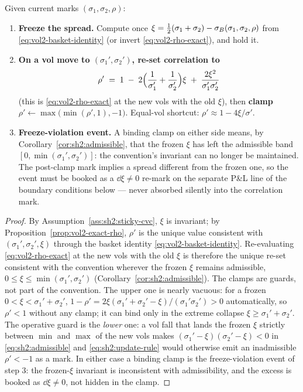 \begin{proposition}\label{prop:sh2:update}
Given current marks $(\sigma_1, \sigma_2, \rho)$:
\begin{enumerate}
\item \textbf{Freeze the spread.} Compute once
  $\xi = \tfrac12(\sigma_1 + \sigma_2) - \sigma_B(\sigma_1, \sigma_2, \rho)$
  from \eqref{eq:vol2-basket-identity} (or invert
  \eqref{eq:vol2-rho-exact}), and hold it.
\item \textbf{On a vol move to $(\sigma_1', \sigma_2')$, re-set correlation
  to}
  \begin{equation}\label{eq:sh2:update-rule}
    \rho' \;=\; 1
    \;-\; 2\Bigl(\frac{1}{\sigma_1'} + \frac{1}{\sigma_2'}\Bigr)\xi
    \;+\; \frac{2\xi^2}{\sigma_1' \sigma_2'}
  \end{equation}
  (this is \eqref{eq:vol2-rho-exact} at the new vols with the old $\xi$),
  then \textbf{clamp} $\rho' \leftarrow \max\bigl(\min(\rho', 1), -1\bigr)$.
  Equal-vol shortcut: $\rho' \approx 1 - 4\xi/\sigma'$.
\item \textbf{Freeze-violation event.} A binding clamp on either side
  means, by Corollary~\ref{cor:sh2:admissible}, that the frozen $\xi$ has
  left the admissible band $[0, \min(\sigma_1', \sigma_2')]$: the
  convention's invariant can no longer be maintained. The post-clamp mark
  implies a spread different from the frozen one, so the event must be
  booked as a $\dd\xi \neq 0$ re-mark on the separate P\&L line of the
  boundary conditions below --- never absorbed silently into the
  correlation mark.
\end{enumerate}
\end{proposition}

\begin{proof}
By Assumption~\ref{ass:sh2:sticky-cvc}, $\xi$ is invariant; by
Proposition~\ref{prop:vol2-exact-rho}, $\rho'$ is the unique value
consistent with $(\sigma_1', \sigma_2', \xi)$ through the basket identity
\eqref{eq:vol2-basket-identity}. Re-evaluating \eqref{eq:vol2-rho-exact} at
the new vols with the old $\xi$ is therefore the unique re-set consistent
with the convention wherever the frozen $\xi$ remains admissible,
$0 \le \xi \le \min(\sigma_1', \sigma_2')$
(Corollary~\ref{cor:sh2:admissible}). The clamps are guards, not part of
the convention. The upper one is nearly vacuous: for a frozen
$0 < \xi < \sigma_1' + \sigma_2'$,
$1 - \rho' = 2\xi(\sigma_1' + \sigma_2' - \xi)/(\sigma_1'\sigma_2') > 0$
automatically, so $\rho' < 1$ without any clamp; it can bind only in the
extreme collapse $\xi \ge \sigma_1' + \sigma_2'$. The operative guard is
the \emph{lower} one: a vol fall that lands the frozen $\xi$ strictly
between $\min$ and $\max$ of the new vols makes
$(\sigma_1' - \xi)(\sigma_2' - \xi) < 0$ in
\eqref{eq:sh2:admissible} and \eqref{eq:sh2:update-rule} would otherwise
emit an inadmissible $\rho' < -1$ as a mark. In either case a binding
clamp is the freeze-violation event of step 3: the frozen-$\xi$ invariant
is inconsistent with admissibility, and the excess is booked as
$\dd\xi \neq 0$, not hidden in the clamp.
\end{proof}

